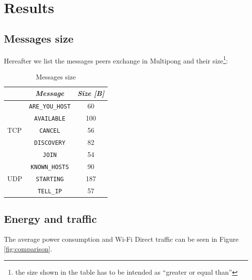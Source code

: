 \section{Results}

\subsection{Messages size}

Hereafter we list the messages peers exchange in Multipong and their
size\footnote{the size shown in the table has to be intended as ``greater or
equal than''}:

\begin{table}[H]
  \centering
  \begin{tabular}{l|c c}
  & \textbf{\textit{Message}} & \textbf{\textit{Size [B]}}  \tabularnewline
            \hline
            \multirow{5}{*}{TCP} & \multicolumn{1}{c}{\texttt{ARE\_YOU\_HOST}} & \multicolumn{1}{c}{60} \\\cline{2-3}
                                 & \multicolumn{1}{c}{\texttt{AVAILABLE}} & \multicolumn{1}{c}{100} \\\cline{2-3}
                                 & \multicolumn{1}{c}{\texttt{CANCEL}} & \multicolumn{1}{c}{56} \\\cline{2-3}
                                 & \multicolumn{1}{c}{\texttt{DISCOVERY}} & \multicolumn{1}{c}{82} \\\cline{2-3}
                                 & \multicolumn{1}{c}{\texttt{JOIN}} & \multicolumn{1}{c}{54} \\\hline
            \multirow{3}{*}{UDP} & \multicolumn{1}{c}{\texttt{KNOWN\_HOSTS}} & \multicolumn{1}{c}{90} \\\cline{2-3}
                                 & \multicolumn{1}{c}{\texttt{STARTING}} & \multicolumn{1}{c}{187} \\\cline{2-3}
                                 & \multicolumn{1}{c}{\texttt{TELL\_IP}} & \multicolumn{1}{c}{57} \\\hline
        \end{tabular}
  \caption{Messages size}
  \label{tab:sizes}
\end{table}

\subsection{Energy and traffic}

The average power consumption and Wi-Fi Direct traffic can be seen in Figure
\ref{fig:comparison}.

